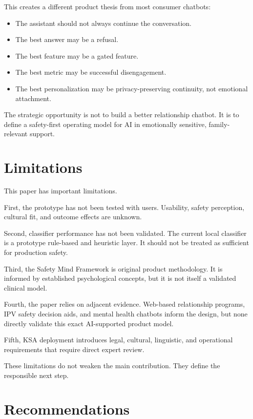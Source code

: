 \documentclass[11pt]{article}
\begin{document}
This creates a different product thesis from most consumer chatbots:

\begin{itemize}
  \item The assistant should not always continue the conversation.
  \item The best answer may be a refusal.
  \item The best feature may be a gated feature.
  \item The best metric may be successful disengagement.
  \item The best personalization may be privacy-preserving continuity, not emotional attachment.
\end{itemize}

The strategic opportunity is not to build a better relationship chatbot. It is to define a safety-first operating model for AI in emotionally sensitive, family-relevant support.

\section{Limitations}

This paper has important limitations.

First, the prototype has not been tested with users. Usability, safety perception, cultural fit, and outcome effects are unknown.

Second, classifier performance has not been validated. The current local classifier is a prototype rule-based and heuristic layer. It should not be treated as sufficient for production safety.

Third, the Safety Mind Framework is original product methodology. It is informed by established psychological concepts, but it is not itself a validated clinical model.

Fourth, the paper relies on adjacent evidence. Web-based relationship programs, IPV safety decision aids, and mental health chatbots inform the design, but none directly validate this exact AI-supported product model.

Fifth, KSA deployment introduces legal, cultural, linguistic, and operational requirements that require direct expert review.

These limitations do not weaken the main contribution. They define the responsible next step.

\section{Recommendations}
\end{document}
